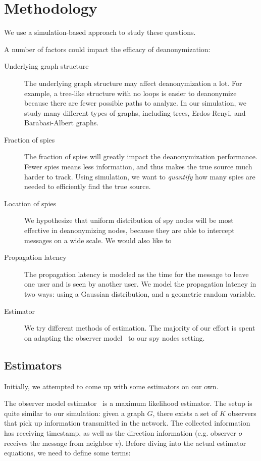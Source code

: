 \section{Methodology}
We use a simulation-based approach to study these questions. 

A number of factors could impact the efficacy of deanonymization:
\begin{description}
\item[Underlying graph structure] The underlying graph structure may affect deanonymization a lot. For example, a tree-like structure with no loops is easier to deanonymize because there are fewer possible paths to analyze. In our simulation, we study many different types of graphs, including trees, Erdos-Renyi, and Barabasi-Albert graphs.
\item[Fraction of spies] The fraction of spies will greatly impact the deanonymization performance. Fewer spies means less information, and thus makes the true source much harder to track. Using simulation, we want to \emph{quantify} how many spies are needed to efficiently find the true source.
\item[Location of spies] We hypothesize that uniform distribution of spy nodes will be most effective in deanonymizing nodes, because they are able to intercept messages on a wide scale. We would also like to 
\item[Propagation latency] The propagation latency is modeled as the time for the message to leave one user and is seen by another user. 
We model the propagation latency in two ways: using a Gaussian distribution, and a geometric random variable. 
\item[Estimator] We try different methods of estimation. The majority of our effort is spent on adapting the observer model~\cite{pinto} to our spy nodes setting.
\end{description}

\subsection{Estimators}
Initially, we attempted to come up with some estimators on our own. 

The observer model estimator~\cite{pinto} is a maximum likelihood estimator. The setup is quite similar to our simulation: given a graph $G$, there exists a set of $K$ observers that pick up information transmitted in the network. The collected information has receiving timestamp, as well as the direction information (e.g. observer $o$ receives the message from neighbor $v$). Before diving into the actual estimator equations, we need to define some terms:

